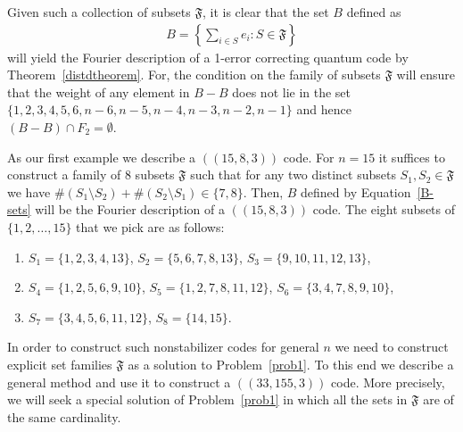 \documentclass{Rinton-P9x6}
\newtheorem{problem}[theorem]{Problem}
\begin{document}
Given such a collection of subsets $\mathfrak{F}$, it is clear that
the set $B$ defined as
\begin{eqnarray}\label{B-sets}
 B =\left\{ \sum_{i \in S} e_i : S \in \mathfrak{F}\right\}
\end{eqnarray}
will yield the Fourier description of a 1-error correcting quantum
code by Theorem~\ref{distdtheorem}. For, the condition on the family
of subsets $\mathfrak{F}$ will ensure that the weight of any element
in $B - B$ does not lie in the set $\{
1,2,3,4,5,6,n-6,n-5,n-4,n-3,n-2,n-1\}$ and hence $(B - B)\cap
F_2=\emptyset$.

As our first example we describe a $((15,8,3))$ code. For $n=15$ it
suffices to construct a family of $8$ subsets $\mathfrak{F}$ such that
for any two distinct subsets $S_1,S_2\in\mathfrak{F}$ we have $\# (S_1
\setminus S_2) + \# (S_2\setminus S_1)\in\{7,8\}$. Then, $B$ defined
by Equation~\ref{B-sets} will be the Fourier description of a
$((15,8,3))$ code. The eight subsets of $\{1,2,\ldots,15\}$ that we
pick are as follows:

\begin{enumerate}
\item[] $S_1 = \{1,2,3,4,13\}$,  $S_2 = \{5,6,7,8,13\}$,  
$S_3 = \{9,10,11,12,13\}$,
\item[] $S_4 = \{1,2,5,6,9,10\}$, $S_5 = \{1,2,7,8,11,12\}$, $S_6 =
\{3,4,7,8,9,10\}$,
\item[] $S_7 = \{3,4,5,6,11,12\}$,  $S_8 = \{14,15\}$.
\end{enumerate}

In order to construct such nonstabilizer codes for general $n$ we need
to construct explicit set families $\mathfrak{F}$ as a solution to
Problem~\ref{prob1}. To this end we describe a general method and use
it to construct a $((33,155,3))$ code. More precisely, we will seek a
special solution of Problem~\ref{prob1} in which all the sets in
$\mathfrak{F}$ are of the same cardinality.

\end{document}
